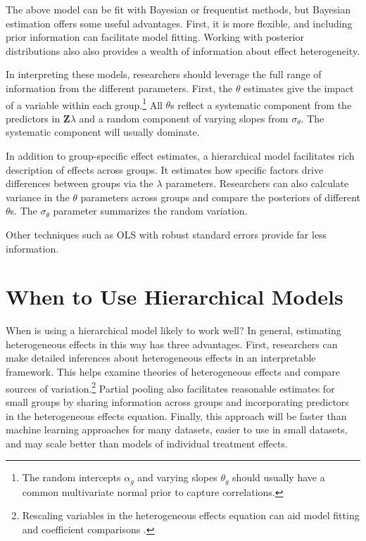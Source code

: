 \documentclass[12pt]{article}
\begin{document}
The above model can be fit with Bayesian or frequentist methods, but Bayesian estimation offers some useful advantages.
First, it is more flexible, and including prior information can facilitate model fitting. 
Working with posterior distributions also also provides a wealth of information about effect heterogeneity. 


In interpreting these models, researchers should leverage the full range of information from the different parameters. 
First, the $\theta$ estimates give the impact of a variable within each group.\footnote{The random intercepts $\alpha_g$ and varying slopes $\theta_g$ should usually have a common multivariate normal prior to capture correlations.}
All $\theta$s reflect a systematic component from the predictors in \textbf{Z}$\lambda$ and a random component of varying slopes from $\sigma_\theta$. 
The systematic component will usually dominate. 


In addition to group-specific effect estimates, a hierarchical model facilitates rich description of effects across groups. 
It estimates how specific factors drive differences between groups via the $\lambda$ parameters.
Researchers can also calculate variance in the $\theta$ parameters across groups and compare the posteriors of different $\theta$s. 
The $\sigma_\theta$ parameter summarizes the random variation. 


Other techniques such as OLS with robust standard errors provide far less information.

\section{When to Use Hierarchical Models}

When is using a hierarchical model likely to work well? 
In general, estimating heterogeneous effects in this way has three advantages.
First, researchers can make detailed inferences about heterogeneous effects in an interpretable framework. 
This helps examine theories of heterogeneous effects and compare sources of variation.\footnote{Rescaling variables in the heterogeneous effects equation can aid model fitting and coefficient comparisons \citep{Gelman2008}.} 
Partial pooling also facilitates reasonable estimates for small groups by sharing information across groups and incorporating predictors in the heterogeneous effects equation. 
Finally, this approach will be faster than machine learning approaches for many datasets, easier to use in small datasets, and may scale better than models of individual treatment effects.
\end{document}
